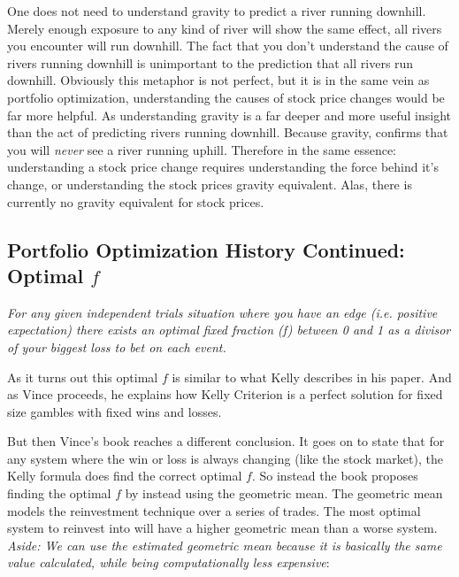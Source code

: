 \documentclass[11pt]{article}
\begin{document}
    One does not need to understand gravity to predict a river running downhill. Merely
    enough exposure to any kind of river will show the same effect, all rivers you
    encounter will run downhill. The fact that you don't understand the cause of rivers
    running downhill is unimportant to the prediction that all
    rivers run downhill. Obviously this metaphor is not perfect, but it is in the
    same vein as portfolio optimization, understanding the causes of stock price changes
    would be far more helpful. As understanding gravity is a far deeper and more useful
    insight than the act of predicting rivers running downhill. Because gravity, confirms
    that you will \textit{never} see a river running uphill. Therefore in the same
    essence: understanding a stock price change requires understanding the force behind
    it's change, or understanding the stock prices gravity equivalent. Alas, there is
    currently no gravity equivalent for stock prices.

\subsection{Portfolio Optimization History Continued: Optimal \(f\)}

    \begin{displayquote} \textit {
        For any given independent trials situation where you have an edge (i.e. positive 
        expectation) there exists an optimal fixed
        fraction (f) between 0 and 1 as a divisor of your biggest loss to bet on each event.
    } \end{displayquote}

    As it turns out this optimal \(f\) is similar to what Kelly describes in his paper.
    And as Vince proceeds, he explains how Kelly Criterion is a perfect solution for 
    fixed size gambles with fixed wins and losses.

    But then Vince's book reaches a different conclusion. It goes on to state that for any system
    where
    the win or loss is always changing {(like the stock market)}, the Kelly formula does find
    the correct optimal \(f\).
    So instead the book proposes finding the optimal \(f\) by instead using the geometric
    mean. The geometric mean models the reinvestment technique over a series of trades.
    The most optimal system to reinvest into will have a higher geometric mean than a
    worse system. \emph{Aside: We can use the estimated geometric mean because it is
    basically the same value calculated, while being computationally less expensive}:
\end{document}
